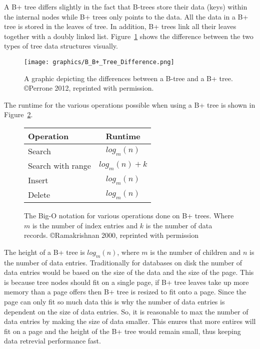 \documentclass[letterpaper, 12pt]{article}
\begin{document}
A B+ tree differs slightly in the fact that B-trees store their data (keys) within the internal nodes while 
B+ trees only points to the data. All the data in a B+ tree is stored in the leaves of tree. In addition,
B+ trees link all their leaves together with a doubly linked list. Figure~\ref{fig:b_b+_tree_diff} shows
the difference between the two types of tree data structures visually.
\par\vspace{\baselineskip}

\begin{figure}[H]
  \centering
  \texttt{[image: graphics/B\_B+\_Tree\_Difference.png]}
  \caption{A graphic depicting the differences between a B-tree and a B+ tree. \copyright Perrone 2012, reprinted with permission.\cite{b+tree}}
  \label{fig:b_b+_tree_diff}
\end{figure}

The runtime for the various operations possible when using a B+ tree is shown
in Figure~\ref{fig:b+_tree_runtimes}.

\begin{figure}[H]
  \centering
  \begin{tabular}{l | c}
    Operation & Runtime \\ \hline \hline
    Search & $log_m(n)$ \\ \hline
    Search with range & $log_m(n) + k$ \\ \hline
    Insert & $log_m(n)$ \\ \hline
    Delete & $log_m(n)$ \\ \hline
  \end{tabular}
  \caption{The Big-O notation for various operations done on B+ trees. Where $m$ is the 
	   number of index entries and $k$ is the number of data records. \copyright Ramakrishnan 2000, reprinted with permission}
  \label{fig:b+_tree_runtimes}
\end{figure}

The height of a B+ tree is $log_m(n)$, where $m$ is the number of children and $n$ is the number of data entries.
Traditionally for databases on disk the number of data entries would be based on the size of the data and
the size of the page. This is because tree nodes should fit on a single page, if B+ tree leaves take up more
memory than a page offers then B+ tree is resized to fit onto a page. Since the page can only fit so much
data this is why the number of data entries is dependent on the size of data entries. So, it is reasonable
to max the number of data entries by making the size of data smaller. This enures that more entires will
fit on a page and the height of the B+ tree would remain small, thus keeping data retrevial performance fast.
\par\vspace{\baselineskip}
\end{document}
